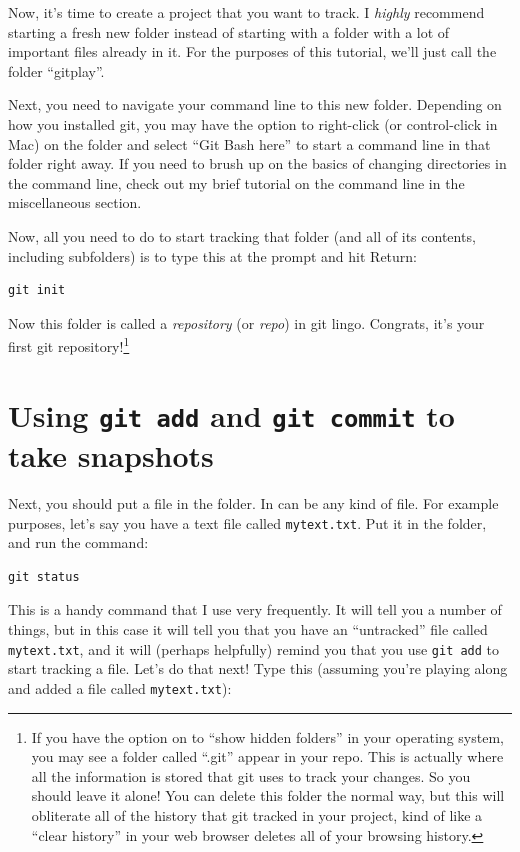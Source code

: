 \documentclass{article}
\begin{document}
Now, it's time to create a project that you want to track.  I \emph{highly} recommend starting a fresh new folder instead of starting with a folder with a lot of important files already in it.  For the purposes of this tutorial, we'll just call the folder ``gitplay''.

Next, you need to navigate your command line to this new folder.  Depending on how you installed git, you may have the option to right-click (or control-click in Mac) on the folder and select ``Git Bash here'' to start a command line in that folder right away. If you need to brush up on the basics of changing directories in the command line, check out my brief tutorial on the command line in the miscellaneous section.

Now, all you need to do to start tracking that folder (and all of its contents, including subfolders) is to type this at the prompt and hit Return:


\begin{verbatim}
git init
\end{verbatim}

Now this folder is called a \emph{repository} (or \emph{repo}) in git lingo.  Congrats, it's your first git repository!\footnote{If you have the option on to ``show hidden folders'' in your operating system, you may see a folder called ``.git'' appear in your repo. This is actually where all the information is stored that git uses to track your changes. So you should leave it alone!  You can delete this folder the normal way, but this will obliterate all of the history that git tracked in your project, kind of like a ``clear history'' in your web browser deletes all of your browsing history.
 }
\section{Using \texttt{git add} and \texttt{git commit} to take snapshots}
\label{sec-6}

Next, you should put a file in the folder. In can be any kind of file.  For example purposes, let's say you have a text file called \texttt{mytext.txt}.  Put it in the folder, and run the command:


\begin{verbatim}
git status
\end{verbatim}

This is a handy command that I use very frequently. It will tell you a number of things, but in this case it will tell you that you have an ``untracked'' file called \texttt{mytext.txt}, and it will (perhaps helpfully) remind you that you use \texttt{git add} to start tracking a file.  Let's do that next!  Type this (assuming you're playing along and added a file called \texttt{mytext.txt}):
\end{document}
